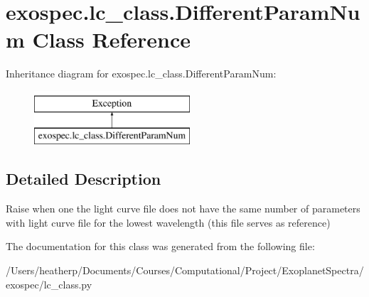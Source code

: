 \hypertarget{classexospec_1_1lc__class_1_1_different_param_num}{}\section{exospec.\+lc\+\_\+class.\+Different\+Param\+Num Class Reference}
\label{classexospec_1_1lc__class_1_1_different_param_num}
Inheritance diagram for exospec.\+lc\+\_\+class.\+Different\+Param\+Num\+:\begin{figure}[H]
\begin{center}
\leavevmode
\includegraphics[height=2.000000cm]{classexospec_1_1lc__class_1_1_different_param_num}
\end{center}
\end{figure}


\subsection{Detailed Description}
\begin{DoxyVerb}Raise when one the light curve file does not have the same number of parameters with light curve file for the lowest wavelength (this file serves as reference)\end{DoxyVerb}
 

The documentation for this class was generated from the following file\+:\begin{DoxyCompactItemize}
\item 
/\+Users/heatherp/\+Documents/\+Courses/\+Computational/\+Project/\+Exoplanet\+Spectra/exospec/lc\+\_\+class.\+py\end{DoxyCompactItemize}
